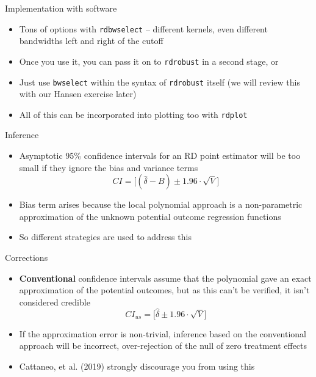 \documentclass{beamer}
\begin{document}
\begin{frame}{Implementation with software}

\begin{itemize}
\item Tons of options with \texttt{rdbwselect} -- different kernels, even different bandwidths left and right of the cutoff
\item Once you use it, you can pass it on to \texttt{rdrobust} in a second stage, or
\item Just use \texttt{bwselect} within the syntax of \texttt{rdrobust} itself (we will review this with our Hansen exercise later)
\item All of this can be incorporated into plotting too with \texttt{rdplot}
\end{itemize}

\end{frame}


\begin{frame}{Inference}

\begin{itemize}
\item Asymptotic 95\% confidence intervals for an RD point estimator will be too small if they ignore the bias and variance terms$$CI=\bigg [ ( \widehat{\delta} - B) \pm 1.96 \cdot \sqrt{V} \bigg ]$$
\item Bias term arises because the local polynomial approach is a non-parametric approximation of the unknown potential outcome regression functions
\item So different strategies are used to address this 
\end{itemize}

\end{frame}

\begin{frame}{Corrections}
\begin{itemize}
\item \textbf{Conventional} confidence intervals assume that the polynomial gave an exact approximation of the potential outcomes, but as this can't be verified, it isn't considered credible $$CI_{us}=\bigg [ \widehat{\delta}  \pm 1.96 \cdot \sqrt{V} \bigg ]$$
\item If the approximation error is non-trivial, inference based on the conventional approach will be incorrect, over-rejection of the null of zero treatment effects
\item Cattaneo, et al. (2019) strongly discourage you from using this
\end{itemize}

\end{frame}
\end{document}
